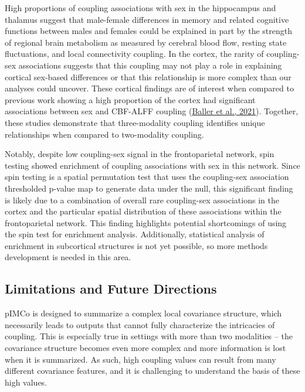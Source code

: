 \documentclass[
  12pt,
]{article}
\begin{document}
High proportions of coupling associations with sex in the hippocampus and thalamus suggest that male-female differences in memory and related cognitive functions between males and females could be explained in part by the strength of regional brain metabolism as measured by cerebral blood flow, resting state fluctuations, and local connectivity coupling. In the cortex, the rarity of coupling-sex associations suggests that this coupling may not play a role in explaining cortical sex-based differences or that this relationship is more complex than our analyses could uncover. These cortical findings are of interest when compared to previous work showing a high proportion of the cortex had significant associations between sex and CBF-ALFF coupling (\protect\hyperlink{ref-ballerDevelopmentalCouplingCerebral2021}{Baller et al., 2021}). Together, these studies demonstrate that three-modality coupling identifies unique relationships when compared to two-modality coupling.

Notably, despite low coupling-sex signal in the frontoparietal network, spin testing showed enrichment of coupling associations with sex in this network. Since spin testing is a spatial permutation test that uses the coupling-sex association thresholded p-value map to generate data under the null, this significant finding is likely due to a combination of overall rare coupling-sex associations in the cortex and the particular spatial distribution of these associations within the frontoparietal network. This finding highlights potential shortcomings of using the spin test for enrichment analysis. Additionally, statistical analysis of enrichment in subcortical structures is not yet possible, so more methods development is needed in this area.

\hypertarget{limitations-and-future-directions}{%
\subsection{Limitations and Future Directions}\label{limitations-and-future-directions}}

pIMCo is designed to summarize a complex local covariance structure, which necessarily leads to outputs that cannot fully characterize the intricacies of coupling. This is especially true in settings with more than two modalities -- the covariance structure becomes even more complex and more information is lost when it is summarized. As such, high coupling values can result from many different covariance features, and it is challenging to understand the basis of these high values.
\end{document}
